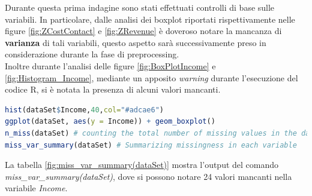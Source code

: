 \documentclass[letterpaper,11pt]{article}
\begin{document}
Durante questa prima indagine sono stati effettuati controlli di base sulle variabili. In particolare, dalle analisi dei boxplot riportati rispettivamente nelle figure \ref{fig:ZCostContact} e \ref{fig:ZRevenue} è doveroso notare la mancanza di \textbf{varianza} di tali variabili, questo aspetto sarà successivamente preso in considerazione durante la fase di preprocessing.\\ Inoltre durante l'analisi delle figure \ref{fig:BoxPlotIncome} e \ref{fig:Histogram_Income}, mediante un apposito \textit{warning} durante l'esecuzione del codice R, si è notata la presenza di alcuni valori mancanti.
\begin{lstlisting}[language=R]
hist(dataSet$Income,40,col="#adcae6")
ggplot(dataSet, aes(y = Income)) + geom_boxplot()
n_miss(dataSet) # counting the total number of missing values in the data
miss_var_summary(dataSet) # Summarizing missingness in each variable 
\end{lstlisting}
La tabella \ref{fig:miss_var_summary(dataSet)} mostra l'output del comando \textit{miss\_var\_summary(dataSet)}, dove si possono notare 24 valori mancanti nella variabile \textit{Income}.
\end{document}
